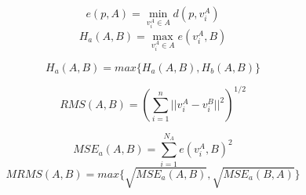 \begin{equation}
e(p, A) = \min_{v^A_i\in A}{d(p, v^A_i)}
\end{equation}
\begin{equation}
H_a(A,B) = \max_{v^A_i\in A}{e(v^A_i, B)}
\end{equation}

\begin{equation}
H_a(A,B) = max\{ H_a(A,B), H_b(A,B) \}
\end{equation}

\begin{equation}
RMS(A,B) = (\sum_{i=1}^n{||v^A_i-v^B_i||^2})^{1/2}
\end{equation}

\begin{equation}
MSE_a(A,B) = \sum_{i=1}^{N_A}{e(v^A_i, B)^2}
\end{equation}
\begin{equation}
MRMS(A,B) = max\{ \sqrt{MSE_a(A,B)}, \sqrt{MSE_a(B,A)} \}
\end{equation}